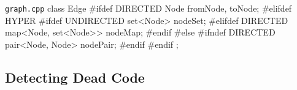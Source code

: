\begin{frame}[fragile]{\myframetitle}
\begin{mycolumns}[t,columns=3,widths={40,23,37},animation=none]
\begin{uncoverenv}
\begin{cpptight}[basicstyle=\small]{\texttt{graph.cpp}}
class Edge {
#ifdef DIRECTED
	Node fromNode, toNode;
#elifdef HYPER
#ifdef UNDIRECTED
	set<Node> nodeSet;
#elifdef DIRECTED
	map<Node, set<Node>> nodeMap;
#endif
#else
#ifndef DIRECTED
	pair<Node, Node> nodePair;
#endif
#endif
};
			\end{cpptight}
		\end{uncoverenv}
	\end{mycolumns}
\end{frame}

\subsection{Detecting Dead Code}

\begin{frame}[fragile]{\myframetitle}
	\vspace*{-4ex}
	\begin{mycolumns}[t,columns=3,widths={40,23,37},animation=none]
\end{mycolumns}
\end{frame}
